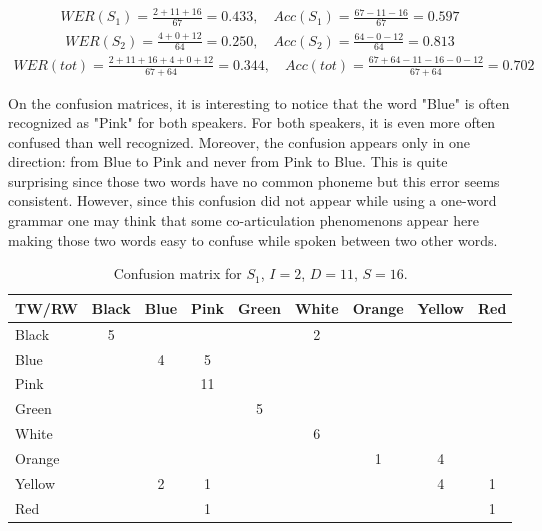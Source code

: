 \begin{align*}
WER(S_1) = \frac{2 + 11 +16}{67} = 0.433,\quad Acc(S_1) = \frac{67-11-16}{67} = 0.597
\end{align*}
\begin{align*}
WER(S_2) = \frac{4 + 0 + 12}{64} = 0.250,\quad Acc(S_2) = \frac{64-0-12}{64} = 0.813 
\end{align*}
\begin{align*}
WER(tot) = \frac{2 + 11 +16 +4 +0 +12}{67+64} = 0.344,\quad Acc(tot) = \frac{67 + 64 -11-16 - 0 -12}{67 + 64} = 0.702 
\end{align*}

On the confusion matrices, it is interesting to notice that the word "Blue" is often recognized as "Pink" for both speakers. For both speakers, it is even more often confused than well recognized. Moreover, the confusion appears only in one direction: from Blue to Pink and never from Pink to Blue. This is quite surprising since those two words have no common phoneme but this error seems consistent. However, since this confusion did not appear while using a one-word grammar one may think that some co-articulation phenomenons appear here making those two words easy to confuse while spoken between two other words. 

\begin{table}[h!]
\begin{center}
  \begin{tabular}{|l|*{8}{c|}}
\hline
 TW/RW  & Black & Blue & Pink & Green & White & Orange & Yellow & Red \\
\hline
Black &	5 & & & & 2 & & &  \\
\hline	
Blue  &	& 4 & 5 & & & & & \\
\hline
Pink  & & & 11 & & & & & \\
\hline					
Green & & & & 5 & & & & \\
\hline
White & & & & & 6 & & & \\
\hline
Orange & & & & & & 1 & 4 & 	\\
\hline
Yellow & & 2 & 1 & & & & 4 & 1 	\\
\hline
Red & & & 1 & & & & & 1 \\
\hline
  \end{tabular}
\end{center}
\caption{Confusion matrix for $S_1$, $I = 2$, $D = 11$, $S=16$.}
\label{tad:david_result}
\end{table}

